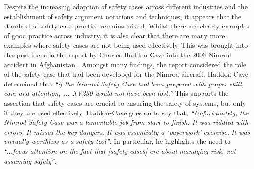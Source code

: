 Despite the increasing adoption of safety cases across different industries and the establishment of safety argument notations and techniques, it appears that the standard of safety case practice remains mixed. Whilst there are clearly examples of good practice across industry, it is also clear that there are many more examples where safety cases are not being used effectively. This was brought into sharpest focus in the report by Charles Haddon-Cave into the 2006 Nimrod accident in Afghanistan \cite{qc2009nimrod}. Amongst many findings, the report considered the role of the safety case that had been developed for the Nimrod aircraft. Haddon-Cave determined that \textit{``if the Nimrod Safety Case had been prepared with proper skill, care and attention, ... XV230 would not have been lost.''} This supports the assertion that safety cases are crucial to ensuring the safety of systems, but only if they are used effectively. Haddon-Cave goes on to say that, \textit{``Unfortunately, the Nimrod Safety Case was a lamentable job from start to finish. It was riddled with errors. It missed the key dangers. It was essentially a ‘paperwork’ exercise. It was virtually worthless as a safety tool''}.  In particular, he highlights the need to \textit{``...focus attention on the fact that [safety cases] are about managing risk, not assuming safety''}.

